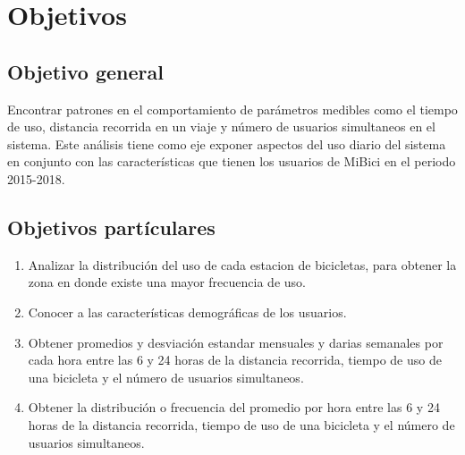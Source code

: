 \section{Objetivos}

\subsection{Objetivo general}

Encontrar patrones en el comportamiento de parámetros medibles como el tiempo de uso, distancia recorrida en un viaje y número de usuarios simultaneos en el sistema. Este análisis tiene como eje exponer aspectos del uso diario del sistema en conjunto con las características que tienen los usuarios de MiBici en el periodo 2015-2018.

\subsection{Objetivos partículares}

\begin{enumerate}
    \item Analizar la distribución del uso de cada estacion de bicicletas, para obtener la zona en donde existe una mayor frecuencia de uso.
    \item Conocer a las características demográficas de los usuarios.
    \item Obtener promedios y desviación estandar mensuales y darias semanales por cada hora entre las 6 y 24 horas de la distancia recorrida, tiempo de uso de una bicicleta y el número de usuarios simultaneos.
    \item  Obtener la distribución o frecuencia del promedio por hora entre las 6 y 24 horas de la distancia recorrida, tiempo de uso de una bicicleta y el número de usuarios simultaneos.
\end{enumerate}